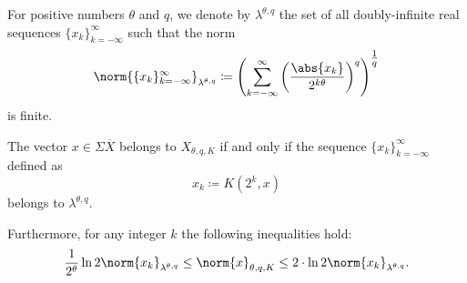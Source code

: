 \begin{definition}\label{def:discrete_k_interpolation_space}
  For positive numbers \( \theta \) and \( q \), we denote by \( \lambda^{\theta,q} \) the set of all doubly-infinite real sequences \( \{ x_k \}_{k=-\infty}^\infty \) such that the norm
  \begin{equation}\label{eq:def:discrete_k_interpolation_space}
    \norm{\{ x_k \}_{k=-\infty}^\infty}_{\lambda^{\theta,q}} \coloneqq \left( \sum_{k=-\infty}^\infty \left( \frac {\abs{x_k}} {2^{k\theta}} \right)^q \right)^{\tfrac 1 q}
  \end{equation}
  is finite.
\end{definition}

\begin{theorem}\label{thm:discrete_k_interpolation}
  The vector \( x \in \Sigma\overline{X} \) belongs to \hyperref[def:k_functional_interpolation_space]{\( X_{\theta,q,K} \)} if and only if the sequence \( \{ x_k \}_{k=-\infty}^\infty \) defined as
  \begin{equation}\label{eq:thm:discrete_k_interpolation/sequence}
    x_k \coloneqq K(2^k, x)
  \end{equation}
  belongs to \hyperref[def:discrete_k_interpolation_space]{\( \lambda^{\theta,q} \)}.

  Furthermore, for any integer \( k \) the following inequalities hold:
  \begin{equation}\label{eq:thm:discrete_k_interpolation/inequalities}
    \frac 1 {2^\theta} \ln 2 \norm{x_k}_{\lambda^{\theta,q}}
    \leq
    \norm{x}_{\theta,q,K}
    \leq
    2 \cdot \ln 2 \norm{x_k}_{\lambda^{\theta,q}}.
  \end{equation}
\end{theorem}
